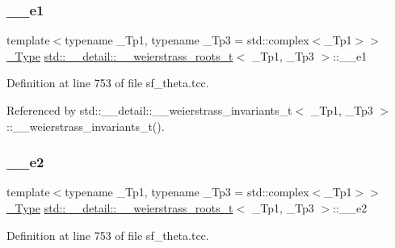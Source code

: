 \subsubsection{\texorpdfstring{\+\_\+\+\_\+e1}{\_\_e1}}
{\footnotesize\ttfamily template$<$typename \+\_\+\+Tp1, typename \+\_\+\+Tp3 = std\+::complex$<$\+\_\+\+Tp1$>$$>$ \\
\hyperlink{structstd_1_1____detail_1_1____weierstrass__roots__t_acda3e0386962aea322dea870977b67ed}{\+\_\+\+Type} \hyperlink{structstd_1_1____detail_1_1____weierstrass__roots__t}{std\+::\+\_\+\+\_\+detail\+::\+\_\+\+\_\+weierstrass\+\_\+roots\+\_\+t}$<$ \+\_\+\+Tp1, \+\_\+\+Tp3 $>$\+::\+\_\+\+\_\+e1}



Definition at line 753 of file sf\+\_\+theta.\+tcc.



Referenced by std\+::\+\_\+\+\_\+detail\+::\+\_\+\+\_\+weierstrass\+\_\+invariants\+\_\+t$<$ \+\_\+\+Tp1, \+\_\+\+Tp3 $>$\+::\+\_\+\+\_\+weierstrass\+\_\+invariants\+\_\+t().

\mbox{\label{structstd_1_1____detail_1_1____weierstrass__roots__t_a2c85c7105b24d122894cb0db93a271a1}} 
\subsubsection{\texorpdfstring{\+\_\+\+\_\+e2}{\_\_e2}}
{\footnotesize\ttfamily template$<$typename \+\_\+\+Tp1, typename \+\_\+\+Tp3 = std\+::complex$<$\+\_\+\+Tp1$>$$>$ \\
\hyperlink{structstd_1_1____detail_1_1____weierstrass__roots__t_acda3e0386962aea322dea870977b67ed}{\+\_\+\+Type} \hyperlink{structstd_1_1____detail_1_1____weierstrass__roots__t}{std\+::\+\_\+\+\_\+detail\+::\+\_\+\+\_\+weierstrass\+\_\+roots\+\_\+t}$<$ \+\_\+\+Tp1, \+\_\+\+Tp3 $>$\+::\+\_\+\+\_\+e2}



Definition at line 753 of file sf\+\_\+theta.\+tcc.

\mbox{\label{structstd_1_1____detail_1_1____weierstrass__roots__t_ace1c2bcb3e385eee959955ea4e4d9f11}} 
